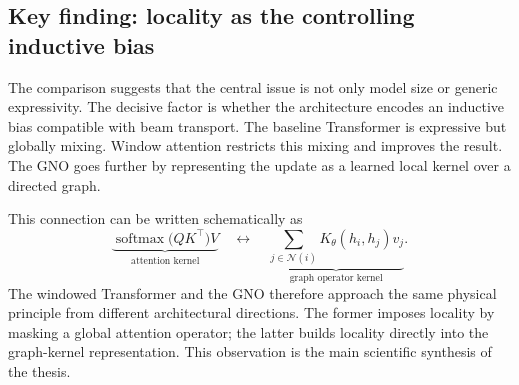 \subsection{Key finding: locality as the controlling inductive bias}
The comparison suggests that the central issue is not only model size or generic expressivity. The decisive factor is whether the architecture encodes an inductive bias compatible with beam transport. The baseline Transformer is expressive but globally mixing. Window attention restricts this mixing and improves the result. The GNO goes further by representing the update as a learned local kernel over a directed graph.

This connection can be written schematically as
\begin{equation}
    \underbrace{\operatorname{softmax}\big(QK^{\top}\big)V}_{\text{attention kernel}}
    \quad\longleftrightarrow\quad
    \underbrace{\sum_{j\in\mathcal{N}(i)}K_{\theta}(h_i,h_j)v_j}_{\text{graph operator kernel}}.
\end{equation}
The windowed Transformer and the GNO therefore approach the same physical principle from different architectural directions. The former imposes locality by masking a global attention operator; the latter builds locality directly into the graph-kernel representation. This observation is the main scientific synthesis of the thesis.


